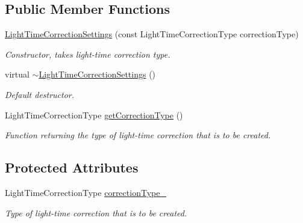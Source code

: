 \subsection*{Public Member Functions}
\begin{DoxyCompactItemize}
\item 
\hyperlink{classtudat_1_1observation__models_1_1LightTimeCorrectionSettings_afc34c776871b0deb9ca4c16e7115aae9}{Light\+Time\+Correction\+Settings} (const Light\+Time\+Correction\+Type correction\+Type)
\begin{DoxyCompactList}\small\item\em Constructor, takes light-\/time correction type. \end{DoxyCompactList}\item 
virtual \hyperlink{classtudat_1_1observation__models_1_1LightTimeCorrectionSettings_a2267ce7437cfff2bc37ea20da3cbfc4e}{$\sim$\+Light\+Time\+Correction\+Settings} ()\hypertarget{classtudat_1_1observation__models_1_1LightTimeCorrectionSettings_a2267ce7437cfff2bc37ea20da3cbfc4e}{}\label{classtudat_1_1observation__models_1_1LightTimeCorrectionSettings_a2267ce7437cfff2bc37ea20da3cbfc4e}

\begin{DoxyCompactList}\small\item\em Default destructor. \end{DoxyCompactList}\item 
Light\+Time\+Correction\+Type \hyperlink{classtudat_1_1observation__models_1_1LightTimeCorrectionSettings_a6ae90356bae4d78beab461688e5a65a1}{get\+Correction\+Type} ()
\begin{DoxyCompactList}\small\item\em Function returning the type of light-\/time correction that is to be created. \end{DoxyCompactList}\end{DoxyCompactItemize}
\subsection*{Protected Attributes}
\begin{DoxyCompactItemize}
\item 
Light\+Time\+Correction\+Type \hyperlink{classtudat_1_1observation__models_1_1LightTimeCorrectionSettings_a673b884fb05c1d42ae4209612808e933}{correction\+Type\+\_\+}\hypertarget{classtudat_1_1observation__models_1_1LightTimeCorrectionSettings_a673b884fb05c1d42ae4209612808e933}{}\label{classtudat_1_1observation__models_1_1LightTimeCorrectionSettings_a673b884fb05c1d42ae4209612808e933}

\begin{DoxyCompactList}\small\item\em Type of light-\/time correction that is to be created. \end{DoxyCompactList}\end{DoxyCompactItemize}


